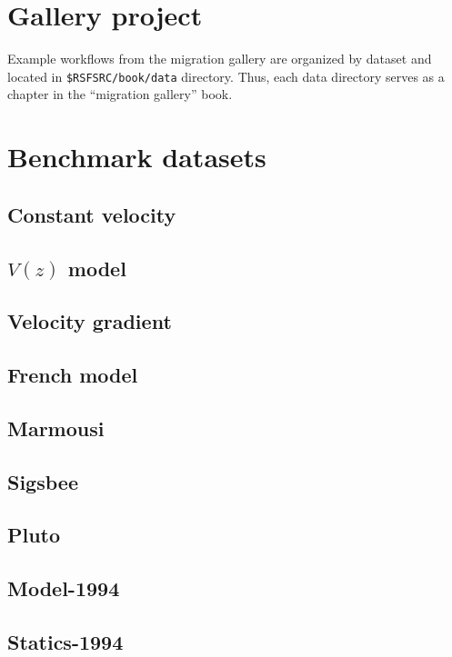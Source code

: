 \section{Gallery project}

Example workflows from the migration gallery are organized by dataset
and located in \texttt{\$RSFSRC/book/data} directory. Thus, each data
directory serves as a chapter in the ``migration gallery'' book.

\section{Benchmark datasets}

\subsection{Constant velocity}

\subsection{$V(z)$ model}

\subsection{Velocity gradient}

\subsection{French model}

\subsection{Marmousi}

\subsection{Sigsbee}

\subsection{Pluto}

\subsection{Model-1994}

\subsection{Statics-1994}

